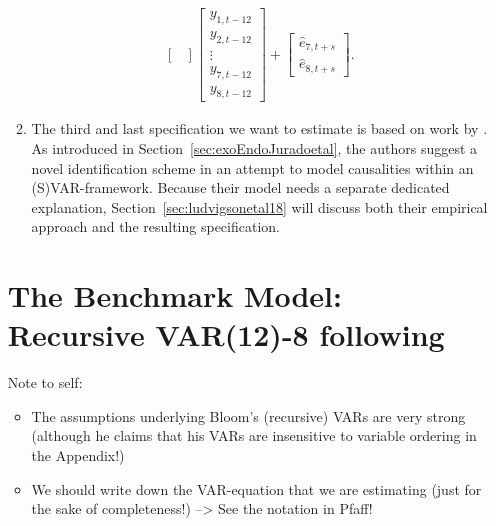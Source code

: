 \documentclass[a4paper,11pt,listof=nochaptergap,oneside,pointednumbers,bibtotoc,bigheadings,liststotoc]{scrbook}
\theoremstyle{mysatz}
\theoremstyle{mydefinition}
\theoremstyle{mybemerkung}
\let\oldhat\hat
\newcommand{\hattnobf}[1]{\oldhat{#1}}
\begin{document}
\begin{itemize}
\begin{enumerate}
\begin{equation}
\begin{split}
\begin{bmatrix}
 		\end{bmatrix} 
		\begin{bmatrix}
    		y_{1,t-12} \\
    		y_{2,t-12} \\
		\vdots \\
		y_{7, t-12} \\
		y_{8, t-12}
 		\end{bmatrix} + 
		\begin{bmatrix}
    		\hattnobf{e}_{7, t+s} \\
		\hattnobf{e}_{8, t+s}
 		\end{bmatrix}. 
\end{split}								
\end{equation}

\item The third and last specification we want to estimate is based on work by \citet{ludvigsonetal:18}. As introduced in Section~\ref{sec:exoEndoJuradoetal}, the authors suggest a novel identification scheme in an attempt to model causalities within an (S)VAR-framework. Because their model needs a separate dedicated explanation, Section~\ref{sec:ludvigsonetal18} will discuss both their empirical approach and the resulting specification.

\end{enumerate}


\section{The Benchmark Model: Recursive VAR(12)-8 following \citet{bloom:09}}
\label{sec:VAR8}


\begingroup
    \fontsize{8pt}{12pt}\selectfont
    Note to self:
\begin{itemize}
	\item The assumptions underlying Bloom's (recursive) VARs are very strong (although he claims that his VARs are insensitive to variable ordering in the Appendix!)
	\item We should write down the VAR-equation that we are estimating (just for the sake of completeness!) --> See the notation in Pfaff!
\end{itemize}
\endgroup


\end{itemize}
\end{document}
